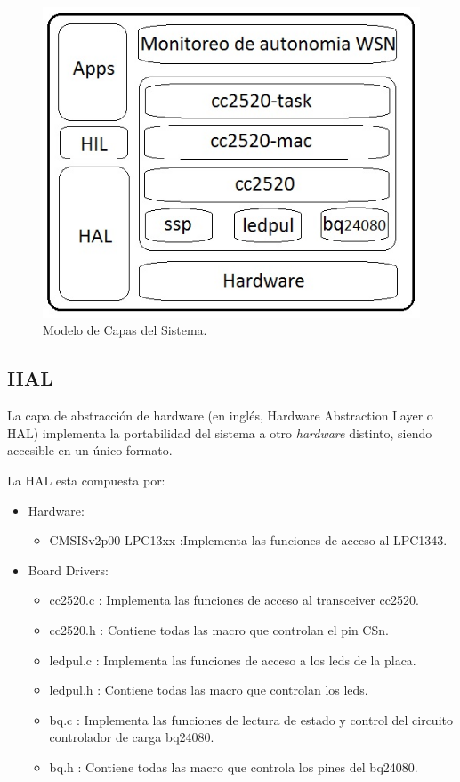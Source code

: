 {\begin{figure}[h!]
	\centering
    \includegraphics[width=.5\textwidth]{./Figures/arq.png}
    	\caption{Modelo de Capas del Sistema.}
	\label{fig:capas}
\end{figure}


\subsection{HAL}
\label{subsec:hal} 

La capa de abstracción de hardware (en inglés, Hardware Abstraction Layer o HAL) implementa la portabilidad del sistema a otro \textit{hardware} distinto, siendo accesible en un único formato.

\noindent La HAL esta compuesta por:
\begin{itemize}
\item Hardware:
	\begin{itemize}
	\item CMSISv2p00 LPC13xx :Implementa las funciones de acceso al LPC1343.	
	\end{itemize}
\item Board Drivers:
	\begin{itemize}
	\item cc2520.c : Implementa las funciones de acceso al transceiver cc2520.
	\item cc2520.h : Contiene todas las macro que controlan el pin CSn.
	\item ledpul.c : Implementa las funciones de acceso a los leds de la placa.
	\item ledpul.h : Contiene todas las macro que controlan los leds.
	\item bq.c : Implementa las funciones de lectura de estado y control del circuito controlador de carga bq24080.
	\item bq.h : Contiene todas las macro que controla los pines del bq24080.
	\end{itemize}
\end{itemize}
		
}
